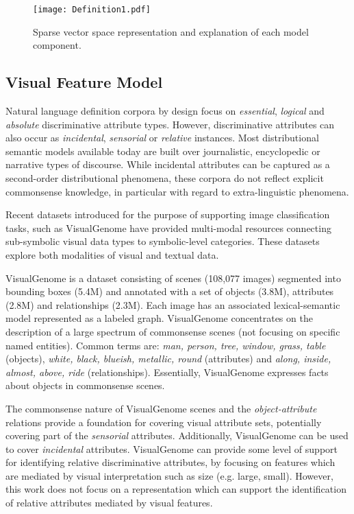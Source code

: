 \documentclass[11pt,a4paper]{article}
\begin{document}
\begin{figure*}[t]
	\centering
    \texttt{[image: Definition1.pdf]}
    \caption{Sparse vector space representation and explanation of each model component.}
    \label{indxDiagram}
\end{figure*}














\subsection{Visual Feature Model}

Natural language definition corpora by design focus on \textit{essential}, \textit{logical} and \textit{absolute} discriminative attribute types. However, discriminative attributes can also occur as \textit{incidental}, \textit{sensorial} or \textit{relative} instances. Most distributional semantic models available today are built over journalistic, encyclopedic or narrative types of discourse. While incidental attributes can be captured as a second-order distributional phenomena, these corpora do not reflect explicit commonsense knowledge, in particular with regard to extra-linguistic phenomena. 

Recent datasets introduced for the purpose of supporting image classification tasks, such as VisualGenome \cite{krishna2017visual} have provided multi-modal resources connecting sub-symbolic visual data types to symbolic-level categories. These datasets explore both modalities of visual and textual data. 

VisualGenome is a dataset consisting of scenes (108,077 images) segmented into bounding boxes (5.4M) and annotated with a set of objects (3.8M), attributes (2.8M) and relationships (2.3M). Each image has an associated lexical-semantic model represented as a labeled graph. VisualGenome concentrates on the description of a large spectrum of commonsense scenes (not focusing on specific named entities). Common terms are: \emph{man, person, tree, window, grass, table} (objects), \emph{white, black, blueish, metallic, round} (attributes) and \emph{along, inside, almost, above, ride} (relationships). Essentially, VisualGenome expresses facts about objects in commonsense scenes.

The commonsense nature of VisualGenome scenes and the \emph{object-attribute} relations provide a foundation for covering visual attribute sets, potentially covering part of the \emph{sensorial} attributes. Additionally, VisualGenome can be used to cover \emph{incidental} attributes. VisualGenome can provide some level of support for identifying relative discriminative attributes, by focusing on features which are mediated by visual interpretation such as size (e.g. large, small). However, this work does not focus on a representation which can support the identification of relative attributes mediated by visual features.
\end{document}
